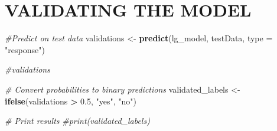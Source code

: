 \documentclass[
]{article}
\newenvironment{Shaded}{\begin{snugshade}}{\end{snugshade}}
\newcommand{\AttributeTok}[1]{\textcolor[rgb]{0.13,0.29,0.53}{#1}}
\newcommand{\CommentTok}[1]{\textcolor[rgb]{0.56,0.35,0.01}{\textit{#1}}}
\newcommand{\FloatTok}[1]{\textcolor[rgb]{0.00,0.00,0.81}{#1}}
\newcommand{\FunctionTok}[1]{\textcolor[rgb]{0.13,0.29,0.53}{\textbf{#1}}}
\newcommand{\NormalTok}[1]{#1}
\newcommand{\OtherTok}[1]{\textcolor[rgb]{0.56,0.35,0.01}{#1}}
\newcommand{\SpecialCharTok}[1]{\textcolor[rgb]{0.81,0.36,0.00}{\textbf{#1}}}
\newcommand{\StringTok}[1]{\textcolor[rgb]{0.31,0.60,0.02}{#1}}
\begin{document}
\section{VALIDATING THE MODEL}\label{validating-the-model}

\begin{Shaded}
\begin{Highlighting}[]
\CommentTok{\#Predict on test data}
\NormalTok{validations }\OtherTok{\textless{}{-}} \FunctionTok{predict}\NormalTok{(lg\_model, testData, }\AttributeTok{type =} \StringTok{"response"}\NormalTok{)}

\CommentTok{\#validations}
\end{Highlighting}
\end{Shaded}

\begin{Shaded}
\begin{Highlighting}[]
\CommentTok{\# Convert probabilities to binary predictions}
\NormalTok{validated\_labels }\OtherTok{\textless{}{-}} \FunctionTok{ifelse}\NormalTok{(validations }\SpecialCharTok{\textgreater{}} \FloatTok{0.5}\NormalTok{, }\StringTok{"yes"}\NormalTok{, }\StringTok{"no"}\NormalTok{)}

\CommentTok{\# Print results}
\CommentTok{\#print(validated\_labels)}
\end{Highlighting}
\end{Shaded}

\begin{Shaded}
\end{Shaded}
\end{document}
